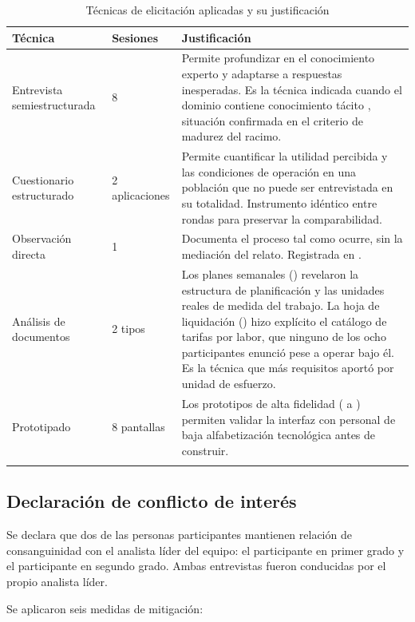 \begin{longtable}{|L{3.6cm}|C{1.6cm}|L{9.4cm}|}
\hline
{}\textbf{Técnica} & \textbf{Sesiones} & \textbf{Justificación} \\
\hline
\endhead
Entrevista semiestructurada & 8 & Permite profundizar en el conocimiento experto y adaptarse a respuestas inesperadas. Es la técnica indicada cuando el dominio contiene conocimiento tácito \cite{ferrari2016}, situación confirmada en el criterio de madurez del racimo. \\ \hline
Cuestionario estructurado & 2 aplicaciones & Permite cuantificar la utilidad percibida y las condiciones de operación en una población que no puede ser entrevistada en su totalidad. Instrumento idéntico entre rondas para preservar la comparabilidad. \\ \hline
Observación directa & 1 & Documenta el proceso tal como ocurre, sin la mediación del relato. Registrada en . \\ \hline
Análisis de documentos & 2 tipos & Los planes semanales () revelaron la estructura de planificación y las unidades reales de medida del trabajo. La hoja de liquidación () hizo explícito el catálogo de tarifas por labor, que ninguno de los ocho participantes enunció pese a operar bajo él. Es la técnica que más requisitos aportó por unidad de esfuerzo. \\ \hline
Prototipado & 8 pantallas & Los prototipos de alta fidelidad ( a ) permiten validar la interfaz con personal de baja alfabetización tecnológica antes de construir. \\ \hline
\caption{Técnicas de elicitación aplicadas y su justificación}
\end{longtable}

\subsection{Declaración de conflicto de interés}

Se declara que dos de las personas participantes mantienen relación de consanguinidad con el
analista líder del equipo: el participante  en primer grado y el participante
 en segundo grado. Ambas entrevistas fueron conducidas por el propio analista líder.

Se aplicaron seis medidas de mitigación:

